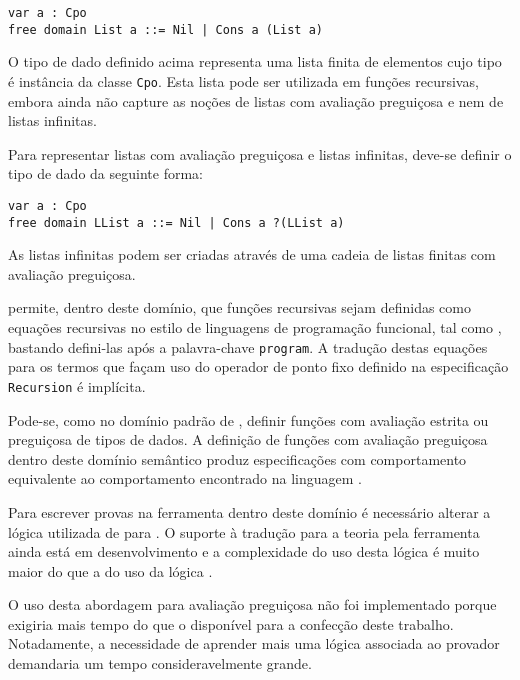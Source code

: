 \begin{Verbatim}
var a : Cpo
free domain List a ::= Nil | Cons a (List a)
\end{Verbatim}

O tipo de dado definido acima representa uma lista finita de elementos cujo tipo é instância da classe \Verb.Cpo..
Esta lista pode ser utilizada em funções recursivas, embora ainda não capture as noções de listas com avaliação preguiçosa e nem de listas infinitas.

Para representar listas com avaliação preguiçosa e listas infinitas, deve-se definir o tipo de dado da seguinte forma:

\begin{Verbatim}
var a : Cpo
free domain LList a ::= Nil | Cons a ?(LList a)
\end{Verbatim}

As listas infinitas podem ser criadas através de uma cadeia de listas finitas com avaliação preguiçosa.

\HasCASL permite, dentro deste domínio, que funções recursivas sejam definidas como equações recursivas no estilo de linguagens de programação funcional, tal como \Haskell, bastando defini-las após a palavra-chave \Verb.program..
A tradução destas equações para os termos que façam uso do operador de ponto fixo definido na especificação \Verb.Recursion. é implícita.

Pode-se, como no domínio padrão de \HasCASL, definir funções com avaliação estrita ou preguiçosa de tipos de dados.
A definição de funções com avaliação preguiçosa dentro deste domínio semântico produz especificações com comportamento equivalente ao comportamento encontrado na linguagem \Haskell.

Para escrever provas na ferramenta \Isabelle dentro deste domínio é necessário alterar a lógica utilizada de \HOL para \HOLCF.
O suporte à tradução para a teoria \HOLCF pela ferramenta \Hets ainda está em desenvolvimento e a complexidade do uso desta lógica é muito maior do que a do uso da lógica \HOL.

O uso desta abordagem para avaliação preguiçosa não foi implementado porque exigiria mais tempo do que o disponível para a confecção deste trabalho.
Notadamente, a necessidade de aprender mais uma lógica associada ao provador \Isabelle demandaria um tempo consideravelmente grande.